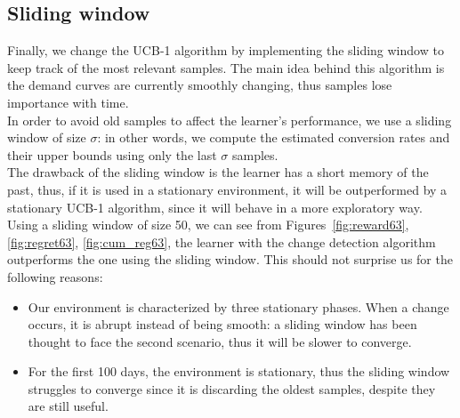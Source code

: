 \subsection{Sliding window}
Finally, we change the UCB-1 algorithm by implementing the sliding window to keep track of the most relevant samples.
The main idea behind this algorithm is the demand curves are currently smoothly changing, thus samples lose importance with time.\\
In order to avoid old samples to affect the learner's performance, we use a sliding window of size $\sigma$: in other words, we compute the estimated conversion rates and their upper bounds using only the last $\sigma$ samples.\\
The drawback of the sliding window is the learner has a short memory of the past, thus, if it is used in a stationary environment, it will be outperformed by a stationary UCB-1 algorithm, since it will behave in a more exploratory way.
Using a sliding window of size 50, we can see from Figures~\ref{fig:reward63}, \ref{fig:regret63}, \ref{fig:cum_reg63}, the learner with the change detection algorithm outperforms
the one using the sliding window. This should not surprise us for the following reasons:
\begin{itemize}
    \item Our environment is characterized by three stationary phases. When a change occurs, it is abrupt instead of being smooth: a sliding window has been thought to face the second scenario, thus it will be slower to converge.
    \item For the first 100 days, the environment is stationary, thus the sliding window struggles to converge since it is discarding the oldest samples, despite they are still useful.
\end{itemize}




